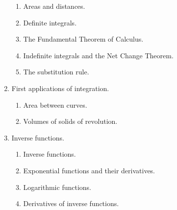 \documentclass{article}
\begin{document}
\begin{enumerate}[label*=\arabic*.]
\begin{enumerate}[label*=\arabic*.]
\item Areas and distances.
\item Definite integrals.
\item The Fundamental Theorem of Calculus.
\item Indefinite integrals and the Net Change Theorem.
\item The substitution rule.
\end{enumerate}
\item First applications of integration.
\begin{enumerate}[label*=\arabic*.]
\item Area between curves.
\item Volumes of solids of revolution.
\end{enumerate}
\item Inverse functions.
\begin{enumerate}[label*=\arabic*.]
\item Inverse functions.
\item Exponential functions and their derivatives.
\item Logarithmic functions.
\item Derivatives of inverse functions.
\end{enumerate}
\end{enumerate}
\end{document}
